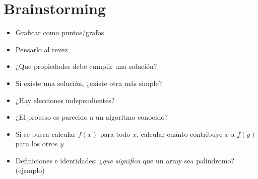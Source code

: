 

\def\title{Notebook}
\tableofcontents\newpage

















\section{Brainstorming}
    \begin{itemize}
        \item Graficar como puntos/grafos
        \item Pensarlo al revez
        \item ¿Que propiedades debe cumplir una solución?
        \item Si existe una solución, ¿existe otra más simple?
        \item ¿Hay elecciones independientes?
        \item ¿El proceso es parecido a un algoritmo conocido?
        \item Si se busca calcular $f(x)$ para todo $x$, calcular cuánto contribuye $x$ a $f(y)$ para los otros $y$
        \item Definiciones e identidades: ¿\textit{que significa} que un array sea palindromo? (ejemplo)
    \end{itemize}

